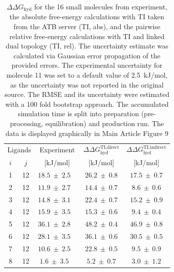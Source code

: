 \begin{table}[h!]
\caption{$\Delta \Delta G_\text{hyd}$ for the 16 small molecules from experiment, the absolute free-energy calculations with TI taken from the ATB server\cite{Stroet2018} (TI, abs), and the pairwise relative free-energy calculations with TI and linked dual topology (TI, rel).
The uncertainty estimate was calculated via Gaussian error propagation of the provided errors. The experimental uncertainty for molecule 11 was set to a default value of 2.5~kJ/mol\cite{Mobley2014}, as the uncertainty was not reported in the original source\cite{Wolfenden1987}. The RMSE and its uncertainty were estimated with a 100 fold bootstrap approach. The accumulated simulation time is split into preparation (pre-processing, equilibration) and production run. The data is displayed graphically in Main Article Figure 9}
\begin{center}
\begin{adjustbox}{max width=\textwidth}
\begin{tabular}{ | c c |c |c|c|}
\hline
  \multicolumn{2}{|c|}{Ligands} & \multicolumn{1}{c|}{Experiment} &\multicolumn{1}{c|}{$\Delta\Delta G_\text{hyd}^\text{TI,direct}$}&\multicolumn{1}{c|}{$\Delta\Delta G_\text{hyd}^\text{TI,indirect}$}\\ 
    $i$ & $j$ & [kJ/mol] & [kJ/mol] & [kJ/mol]  \\
  \hline \hline
        1 &  12 &  $18.5 ~\pm~ 2.5$ ~\cite{Guthrie2014,Rizzo2006}&  $26.2 ~\pm~ 0.8$ &  $  17.5 ~\pm~ 0.7$\\
        2 &  12 &  $11.9 ~\pm~ 2.7$  ~\cite{Guthrie2014,Rizzo2006}  &  $14.4 ~\pm~ 0.7$ &  $  8.6 ~\pm~ 0.6 $\\
        3 &  12 &  $14.8 ~\pm~ 3.1$  ~\cite{Guthrie2014,Rizzo2006}  &  $22.4 ~\pm~ 0.7$ &  $ 15.2 ~\pm~ 0.9 $\\
        4 &  12 &  $15.9 ~\pm~ 3.5$  ~\cite{Rizzo2006} &  $15.3 ~\pm~ 0.6$ &  $  9.4 ~\pm~ 0.4 $\\
        5 &  12 &   $36.1 ~\pm~ 2.8$  ~\cite{Guthrie2014,Rizzo2006}  &  $48.2 ~\pm~ 0.4$ &  $ 46.9 ~\pm~ 0.8 $\\
        6 &  12 &   $28.1 ~\pm~ 3.5$  ~\cite{Rizzo2006}  &  $36.1 ~\pm~ 0.6$ & $  30.5 ~\pm~ 0.5 $\\
        7 &  12 &   $10.6 ~\pm~ 2.5$  ~\cite{Guthrie2009,Rizzo2006} &  $22.8 ~\pm~ 0.5$ &  $  9.5 ~\pm~ 0.9 $\\
        8 &  12 &   $ 1.6 ~\pm~ 3.5$  ~\cite{Mobley2014,Rizzo2006} &  $ 5.2 ~\pm~ 0.7$ &  $ 3.0 ~\pm~ 1.2 $\\

\end{tabular}
\end{adjustbox}
\end{center}
\end{table}
